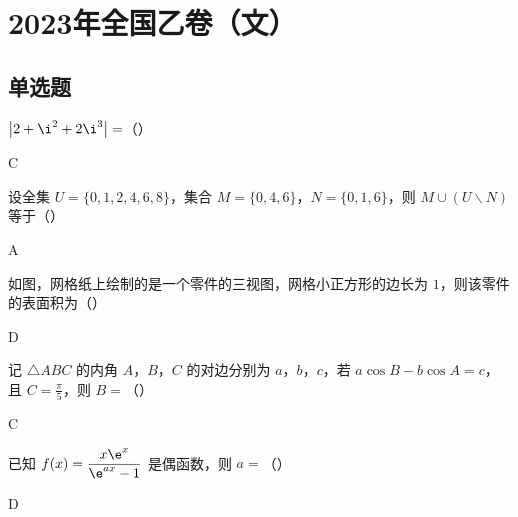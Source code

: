 \chapter{2023年全国乙卷（文）}

\section{单选题}

\begin{problem}
\(\left|2+\i^2+2\i^3\right|=\)（\quad）

\begin{answer}
C
\end{answer}
\end{problem}

\begin{problem}
设全集 \(U=\{0,1,2,4,6,8\}\)，集合 \(M=\{0,4,6\}\)，\(N=\{0,1,6\}\)，则 \(M\cup(U\mathbin{\backslash}N)\) 等于（\quad）

\begin{answer}
A
\end{answer}
\end{problem}

\begin{problem}
如图，网格纸上绘制的是一个零件的三视图，网格小正方形的边长为 \(1\)，则该零件的表面积为（\quad）
\begin{center}\end{center}

\begin{answer}
D
\end{answer}
\end{problem}

\begin{problem}
记 \(\triangle ABC\) 的内角 \(A\)，\(B\)，\(C\) 的对边分别为 \(a\)，\(b\)，\(c\)，若 \(a\cos B-b\cos A=c\)，且 \(C=\frac\pi5\)，则 \(B=\)（\quad）

\begin{answer}
C
\end{answer}
\end{problem}

\begin{problem}
已知 \(f(x)=\dfrac{x\e^x}{\e^{ax}-1}\) 是偶函数，则 \(a=\)（\quad）

\begin{answer}
D
\end{answer}
\end{problem}

